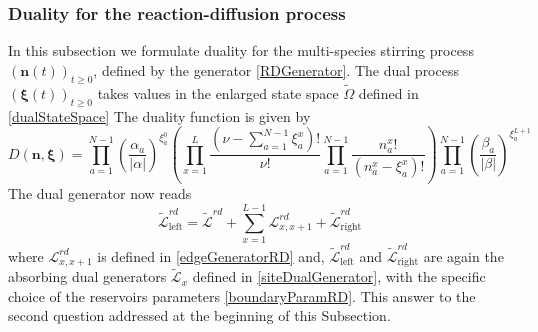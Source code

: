 \documentclass[10pt]{article}
\numberwithin{equation}{section}
\numberwithin{equation}{subsection}
\begin{document}
\subsubsection{Duality for the reaction-diffusion process}
In this subsection we formulate duality for the multi-species stirring process $(\bm{n}(t))_{t\geq 0}$, defined by the generator \eqref{RDGenerator}.
The dual  process $(\bm{\xi}(t))_{t\geq 0}$ takes values in the enlarged state space $\widetilde{\Omega}$ defined in \eqref{dualStateSpace}
The duality function is given by
\begin{equation}
	D(\bm{n},\bm{\xi})=\prod_{a=1}^{N-1}\left(\frac{\alpha_{a}}{|\alpha|}\right)^{\xi_{a}^{0}}\left(\prod_{x=1}^{L}\frac{(\nu -\sum_{a=1}^{N-1}\xi_{a}^{x})!}{\nu!}\prod_{a=1}^{N-1}\frac{n_{a}^{x}!}{(n_{a}^{x}-\xi_{a}^{x})!}\right)\prod_{a=1}^{N-1}\left(\frac{\beta_{a}}{|\beta|}\right)^{\xi_{a}^{L+1}}
\end{equation}
The dual generator now reads
\begin{equation}\label{DualGeneratorRD}
	\widetilde{\mathcal{L}}_{\text{left}}^{rd}=\widetilde{\mathcal{L}}^{rd}+\sum_{x=1}^{L-1}\mathcal{L}_{x,x+1}^{rd}+\widetilde{\mathcal{L}}_{\text{right}}^{rd}
\end{equation}
where 
$\mathcal{L}_{x,x+1}^{rd}$ is defined in \eqref{edgeGeneratorRD} and, $\widetilde{\mathcal{L}}_{\text{left}}^{rd}$ and $\widetilde{\mathcal{L}}_{\text{right}}^{rd}$ are again the absorbing dual generators $\widetilde{\mathcal{L}}_{x}$ defined in \eqref{siteDualGenerator}, with the specific choice of the reservoirs parameters \eqref{boundaryParamRD}. This answer to the second question addressed at the beginning of this Subsection. 
\end{document}
